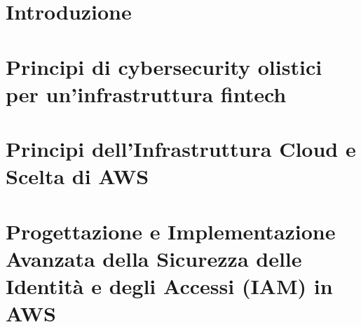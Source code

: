 \documentclass[a4paper,12pt]{report}
\begin{document}
\setcounter{tocdepth}{2} %
\tableofcontents
\listoffigures %

\chapter{Introduzione}
\label{chapter:introduzione}


\chapter{Principi di cybersecurity olistici \allowbreak{} per un'infrastruttura fintech}
\label{ch:principi-cybersecurity}


\chapter{Principi dell'Infrastruttura Cloud e Scelta di AWS}
\label{ch:cloud-aws}

\chapter{Progettazione e Implementazione Avanzata della Sicurezza delle Identità e degli Accessi (IAM) in AWS}
\label{ch:iam_security}

%
\printbibliography
% 
\end{document}
